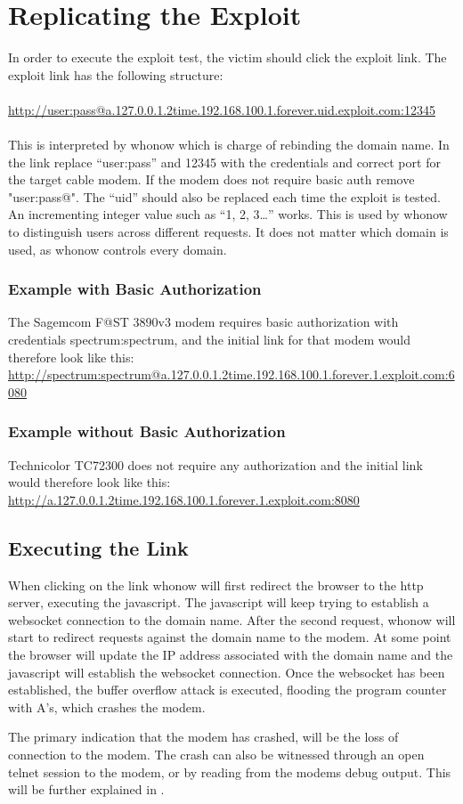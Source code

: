 \section{Replicating the Exploit}
In order to execute the exploit test, the victim should click the exploit link.
The exploit link has the following structure:
\\\\
\url{http://user:pass@a.127.0.0.1.2time.192.168.100.1.forever.uid.exploit.com:12345}
\\\\
This is interpreted by whonow which is charge of rebinding the domain name.
In the link replace \enquote{user:pass} and 12345 with the credentials and correct port for the target cable modem. 
If the modem does not require basic auth remove "user:pass@".
The \enquote{uid} should also be replaced each time the exploit is tested. 
An incrementing integer value such as \enquote{1, 2, 3\dots} works.
This is used by whonow to distinguish users across different requests.
It does not matter which domain is used, as whonow controls every domain.

\subsubsection*{Example with Basic Authorization}
The Sagemcom F@ST 3890v3 modem requires basic authorization with credentials spectrum:spectrum, and the initial link for that modem would therefore look like this:
\\
\url{http://spectrum:spectrum@a.127.0.0.1.2time.192.168.100.1.forever.1.exploit.com:6080}

\subsubsection*{Example without Basic Authorization}
Technicolor TC72300 does not require any authorization and the initial link would therefore look like this:
\\
\url{http://a.127.0.0.1.2time.192.168.100.1.forever.1.exploit.com:8080}

\subsection{Executing the Link}
When clicking on the link whonow will first redirect the browser to the http server, executing the javascript. 
The javascript will keep trying to establish a websocket connection to the domain name. 
After the second request, whonow will start to redirect requests against the domain name to the modem. 
At some point the browser will update the IP address associated with the domain name and the javascript will establish the websocket connection.
Once the websocket has been established, the buffer overflow attack is executed, flooding the program counter with A's, which crashes the modem. 

The primary indication that the modem has crashed, will be the loss of connection to the modem. 
The crash can also be witnessed through an open telnet session to the modem, or by reading from the modems debug output.
This will be further explained in .